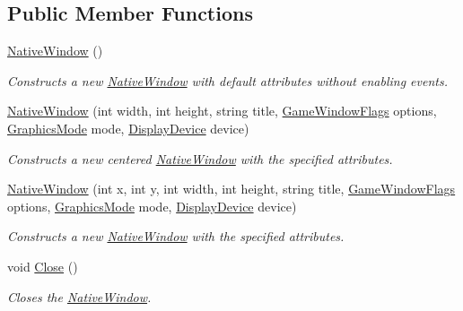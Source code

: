 \subsection*{Public Member Functions}
\begin{DoxyCompactItemize}
\item 
\hyperlink{class_open_t_k_1_1_native_window_aedcb5b381bebdedbe85834e05a7639c0}{Native\-Window} ()
\begin{DoxyCompactList}\small\item\em Constructs a new \hyperlink{class_open_t_k_1_1_native_window}{Native\-Window} with default attributes without enabling events.\end{DoxyCompactList}\item 
\hyperlink{class_open_t_k_1_1_native_window_a8aeb7aba37baeb414eed22374cdccef5}{Native\-Window} (int width, int height, string title, \hyperlink{namespace_open_t_k_af73dc15fc9d5b87827c81fa11b3ec6f0}{Game\-Window\-Flags} options, \hyperlink{class_open_t_k_1_1_graphics_1_1_graphics_mode}{Graphics\-Mode} mode, \hyperlink{class_open_t_k_1_1_display_device}{Display\-Device} device)
\begin{DoxyCompactList}\small\item\em Constructs a new centered \hyperlink{class_open_t_k_1_1_native_window}{Native\-Window} with the specified attributes.\end{DoxyCompactList}\item 
\hyperlink{class_open_t_k_1_1_native_window_a8c3ab784c89cf6eb36f3ce7ace16a193}{Native\-Window} (int x, int y, int width, int height, string title, \hyperlink{namespace_open_t_k_af73dc15fc9d5b87827c81fa11b3ec6f0}{Game\-Window\-Flags} options, \hyperlink{class_open_t_k_1_1_graphics_1_1_graphics_mode}{Graphics\-Mode} mode, \hyperlink{class_open_t_k_1_1_display_device}{Display\-Device} device)
\begin{DoxyCompactList}\small\item\em Constructs a new \hyperlink{class_open_t_k_1_1_native_window}{Native\-Window} with the specified attributes.\end{DoxyCompactList}\item 
void \hyperlink{class_open_t_k_1_1_native_window_ae7dae9eca1c2298dbcdbc34a81304a61}{Close} ()
\begin{DoxyCompactList}\small\item\em Closes the \hyperlink{class_open_t_k_1_1_native_window}{Native\-Window}. \end{DoxyCompactList}\item 

\end{DoxyCompactItemize}
